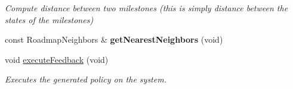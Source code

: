 \begin{DoxyCompactItemize}
\begin{DoxyCompactList}\small\item\em \-Compute distance between two milestones (this is simply distance between the states of the milestones) \end{DoxyCompactList}\item 
\hypertarget{class_f_i_r_m_ad6df82888d88ab8479f92f9f3e453c2e}{const \-Roadmap\-Neighbors \& {\bfseries get\-Nearest\-Neighbors} (void)}\label{class_f_i_r_m_ad6df82888d88ab8479f92f9f3e453c2e}

\item 
\hypertarget{class_f_i_r_m_ae448791d4c9af9016bc9d5e9de166f0e}{void \hyperlink{class_f_i_r_m_ae448791d4c9af9016bc9d5e9de166f0e}{execute\-Feedback} (void)}\label{class_f_i_r_m_ae448791d4c9af9016bc9d5e9de166f0e}

\begin{DoxyCompactList}\small\item\em \-Executes the generated policy on the system. \end{DoxyCompactList}\end{DoxyCompactItemize}
